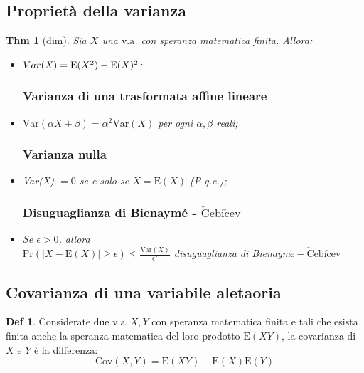 \documentclass[a4paper,11pt]{article}
\theoremstyle{plain}
\newtheorem{thm}{Thm}[section]
\theoremstyle{definition}
\newtheorem{defn}{Def}[section]
\theoremstyle{remark}
\begin{document}
\subsection{Proprietà della varianza}
\begin{thm} [dim] Sia $X$ una $\mathrm{v}.\mathrm{a}$. con speranza matematica finita. Allora:
\begin{itemize}
\subsubsection{Def alternativa}
\item[$\star$] $Var({\it X}) =\mathrm{E}(X^{2})-\mathrm{E}(X)^{2}$; 
\subsubsection{Varianza di una trasformata affine lineare}
\item[$\star \star $] $\mathrm{V}\mathrm{a}\mathrm{r}(\alpha X+\beta)=\alpha^{2}\mathrm{V}\mathrm{a}\mathrm{r}(X)$ per ogni $\alpha, \beta$ reali; 
\subsubsection{Varianza nulla}
\item Var(X) $=0$ se e solo se $X=\mathrm{E}(X)$ (P-q.c.);
\subsubsection{Disuguaglianza di Bienaymé - $\check{\mathrm{C}}\mathrm{e}\mathrm{b}\mathrm{i}\check{\mathrm{c}}\mathrm{e}\mathrm{v}$}
\item[$\star \star \star$] Se $\epsilon>0$, allora \\ $\displaystyle \mathrm{P}\mathrm{r}(|X-\mathrm{E}(X)|\geq\epsilon)\leq\frac{\mathrm{V}\mathrm{a}\mathrm{r}(X)}{\epsilon^{2}}$ disuguaglianza di Bienaym$\acute{\mathrm{e}}-\check{\mathrm{C}}\mathrm{e}\mathrm{b}\mathrm{i}\check{\mathrm{c}}\mathrm{e}\mathrm{v}$
\end{itemize}
\end{thm}

\subsection{Covarianza di una variabile aletaoria}

\begin{defn}
Considerate due $\mathrm{v}.\mathrm{a}.\, X, Y$ con speranza matematica finita $\mathrm{e}$ tali che esista finita anche la speranza matematica del loro prodotto $\mathrm{E}(XY)$, la covarianza di $X$ e $Y$ è la differenza:
$$
\mathrm{C}\mathrm{o}\mathrm{v}(X, Y)=\mathrm{E}(XY)-\mathrm{E}(X)\mathrm{E}(Y)
$$
\end{defn}
\end{document}
